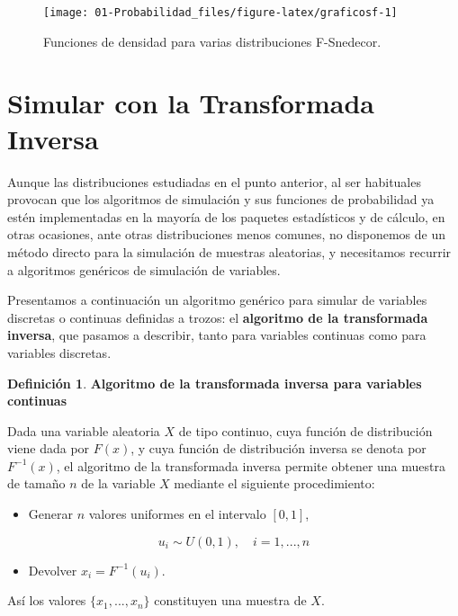 \documentclass[
]{book}
\providecommand{\tightlist}{%
  \setlength{\itemsep}{0pt}\setlength{\parskip}{0pt}}
\newenvironment{yellowbox}{
  \definecolor{shadecolor}{rgb}{210, 180, 140}  
  \color{black}
  \begin{shaded}}
 {\end{shaded}}
\theoremstyle{definition}
\newtheorem{definition}{Definición}[chapter]
\theoremstyle{definition}
\theoremstyle{definition}
\theoremstyle{definition}
\theoremstyle{remark}
\begin{document}
\begin{figure}

{\centering \texttt{[image: 01-Probabilidad\_files/figure-latex/graficosf-1]} 

}

\caption{Funciones de densidad para varias distribuciones F-Snedecor.}\label{fig:graficosf}
\end{figure}

\hypertarget{transformadainversa}{%
\section{Simular con la Transformada Inversa}\label{transformadainversa}}

Aunque las distribuciones estudiadas en el punto anterior, al ser habituales provocan que los algoritmos de simulación y sus funciones de probabilidad ya estén implementadas en la mayoría de los paquetes estadísticos y de cálculo, en otras ocasiones, ante otras distribuciones menos comunes, no disponemos de un método directo para la simulación de muestras aleatorias, y necesitamos recurrir a algoritmos genéricos de simulación de variables.

Presentamos a continuación un algoritmo genérico para simular de variables discretas o continuas definidas a trozos: el \textbf{algoritmo de la transformada inversa}, que pasamos a describir, tanto para variables continuas como para variables discretas.

\begin{yellowbox}

\begin{definition}
\protect\hypertarget{def:aticontinua}{}\label{def:aticontinua}\textbf{Algoritmo de la transformada inversa para variables continuas}

Dada una variable aleatoria \(X\) de tipo continuo, cuya función de distribución viene dada por \(F(x)\), y cuya función de distribución inversa se denota por \(F^{-1}(x)\), el algoritmo de la transformada inversa permite obtener una muestra de tamaño \(n\) de la variable \(X\) mediante el siguiente procedimiento:

\begin{itemize}
\tightlist
\item
  Generar \(n\) valores uniformes en el intervalo \([0,1]\),
\end{itemize}

\[u_i\sim U(0,1), \quad i=1,...,n\]

\begin{itemize}
\tightlist
\item
  Devolver \(x_i = F^{-1}(u_i)\).
\end{itemize}

Así los valores \(\{x_1,...,x_n\}\) constituyen una muestra de \(X\).
\end{definition}

\end{yellowbox}
\end{document}
